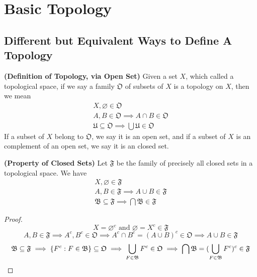 \documentclass{report}
\begin{document}
\chapter{Basic Topology}
\section{Different but Equivalent Ways to Define A Topology}
\begin{definition}
\label{2.1.1}
\textbf{(Definition of Topology, via Open Set)} Given a set $X$, which called a topological space, if we say a family $\mathfrak{O}$  of subsets of $X$ is a topology on $X$, then we mean
\begin{gather}
X, \varnothing \in \mathfrak{O}\\
A,B\in\mathfrak{O}\implies A\cap B\in\mathfrak{O}\\
\mathfrak{U}\subseteq \mathfrak{O}\implies \bigcup \mathfrak{U}\in \mathfrak{O}
\end{gather}
If a subset of $X$ belong to  $\mathfrak{O}$, we say it is an open set, and if a subset of $X$ is an complement of an open set, we say it is an closed set.
\end{definition}
\begin{theorem}
\label{2.1.2}
\textbf{(Property of Closed Sets)} Let $\mathfrak{F}$ be the family of precisely all closed sets in a topological space. We have
\begin{gather}
X,\varnothing \in \mathfrak{F}\\
A,B\in\mathfrak{F}\implies A\cup  B\in\mathfrak{F}\\
\mathfrak{B}\subseteq \mathfrak{F}\implies \bigcap \mathfrak{B}\in \mathfrak{F}
\end{gather}
\end{theorem}
\begin{proof}
\begin{equation}
X=\varnothing^c\text{ and }\varnothing=X^c\in \mathfrak{F}
\end{equation}
\begin{equation}
A,B\in \mathfrak{F}\implies A^c,B^c \in \mathfrak{O}\implies A^c \cap B^c=(A\cup B)^c \in \mathfrak{O} \implies A\cup  B \in \mathfrak{F}
\end{equation}
\begin{equation}
\mathfrak{B}\subseteq \mathfrak{F}\implies \{ F^c:F \in \mathfrak{B} \}\subseteq \mathfrak{O}\implies \bigcup_{F\in \mathfrak{B}}F^c \in \mathfrak{O}\implies \bigcap \mathfrak{B}= (\bigcup_{F \in\mathfrak{B}} F^c)^c \in \mathfrak{F}
\end{equation}
\end{proof}
\end{document}
